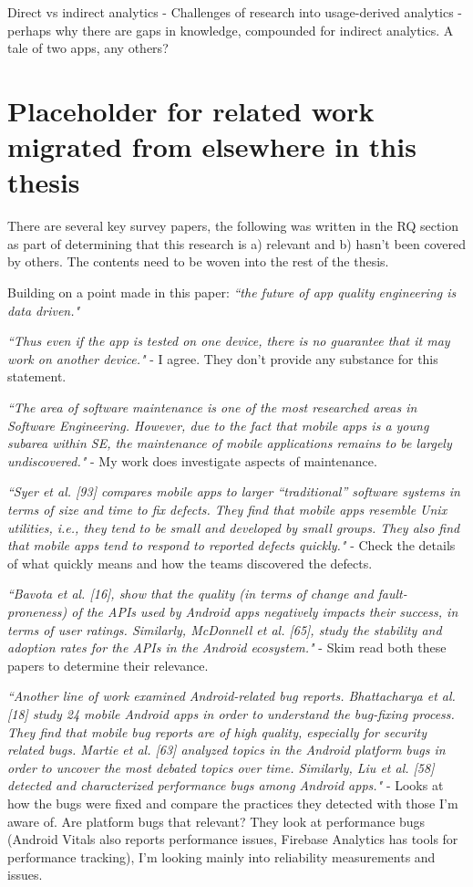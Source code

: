 Direct vs indirect analytics - 
Challenges of research into usage-derived analytics - perhaps why there are gaps in knowledge, compounded for indirect analytics. A tale of two apps, any others?


\section{Placeholder for related work migrated from elsewhere in this thesis}
There are several key survey papers, the following was written in the RQ section as part of determining that this research is a) relevant and b) hasn't been covered by others. The contents need to be woven into the rest of the thesis.

\begin{mdframed}[style=MyFrame]




Building on a point made in this paper: \emph{``the future of app quality engineering is data driven."}~\citep{maalej2016_towards_data_driven_requirements_engineering} %

\emph{``Thus even if the app is tested on one device, there is no guarantee that it may work on another device."} - I agree. They don't provide any substance for this statement.

\emph{``The area of software maintenance is one of the most researched areas in Software Engineering. However, due to the fact that mobile apps is a young subarea within SE, the maintenance of mobile applications remains to be largely undiscovered."} - My work does investigate aspects of maintenance. 

\emph{``Syer et al. [93] compares mobile apps to larger “traditional” software systems in terms of size and time to fix defects. They find that mobile apps resemble Unix utilities, i.e., they tend to be small and developed by small groups. They also find that mobile apps tend to respond to reported defects quickly."} - Check the details of what quickly means and how the teams discovered the defects.

\emph{``Bavota et al. [16], show that the quality (in terms of change and fault-proneness) of the APIs used by Android apps negatively impacts their success, in terms of user ratings. Similarly, McDonnell et al. [65], study the stability and adoption rates for the APIs in the Android ecosystem."} - Skim read both these papers to determine their relevance.

\emph{``Another line of work examined Android-related bug reports. Bhattacharya et al. [18] study 24 mobile Android apps in order to understand the bug-fixing process. They find that mobile bug reports are of high quality, especially for security related bugs. Martie et al. [63] analyzed topics in the Android platform bugs in order to uncover the most debated topics over time. Similarly, Liu et al. [58] detected and characterized performance bugs among Android apps."} - Looks at how the bugs were fixed and compare the practices they detected with those I'm aware of. Are platform bugs that relevant? They look at performance bugs (Android Vitals also reports performance issues, Firebase Analytics has tools for performance tracking), I'm looking mainly into reliability measurements and issues.


\end{mdframed}
